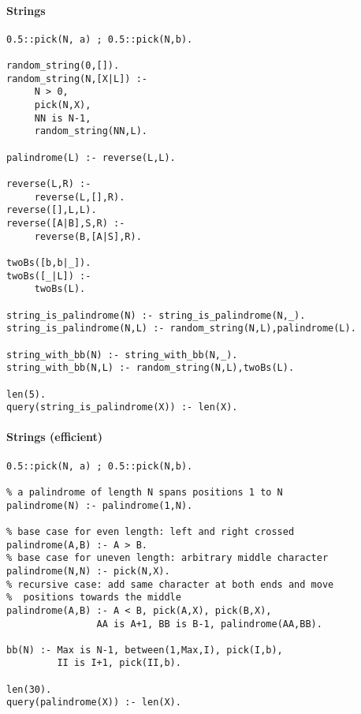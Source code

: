 \paragraph{Strings}
\begin{verbatim}
0.5::pick(N, a) ; 0.5::pick(N,b).

random_string(0,[]).
random_string(N,[X|L]) :-
     N > 0,
     pick(N,X),
     NN is N-1,
     random_string(NN,L).

palindrome(L) :- reverse(L,L).

reverse(L,R) :-
     reverse(L,[],R).
reverse([],L,L).
reverse([A|B],S,R) :-
     reverse(B,[A|S],R).

twoBs([b,b|_]).
twoBs([_|L]) :-
     twoBs(L).

string_is_palindrome(N) :- string_is_palindrome(N,_).
string_is_palindrome(N,L) :- random_string(N,L),palindrome(L).

string_with_bb(N) :- string_with_bb(N,_).
string_with_bb(N,L) :- random_string(N,L),twoBs(L).

len(5).
query(string_is_palindrome(X)) :- len(X).
\end{verbatim}

\paragraph{Strings (efficient)}

\begin{verbatim}
0.5::pick(N, a) ; 0.5::pick(N,b).

% a palindrome of length N spans positions 1 to N
palindrome(N) :- palindrome(1,N).

% base case for even length: left and right crossed
palindrome(A,B) :- A > B.
% base case for uneven length: arbitrary middle character
palindrome(N,N) :- pick(N,X).
% recursive case: add same character at both ends and move
%  positions towards the middle
palindrome(A,B) :- A < B, pick(A,X), pick(B,X),
                AA is A+1, BB is B-1, palindrome(AA,BB).

bb(N) :- Max is N-1, between(1,Max,I), pick(I,b),
         II is I+1, pick(II,b).

len(30).
query(palindrome(X)) :- len(X).
\end{verbatim}

